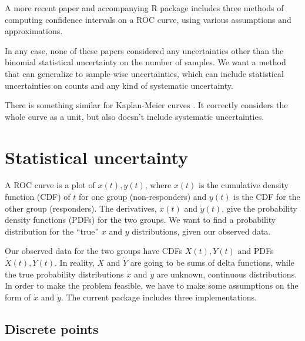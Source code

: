 \documentclass[11pt]{article}
\newcommand{\xdot}{\dot{x}}
\newcommand{\ydot}{\dot{y}}
\newcommand{\Xdot}{\dot{X}}
\newcommand{\Ydot}{\dot{Y}}
\begin{document}
A more recent paper and accompanying R package \autocite{roc_fernandez} includes three methods of computing confidence intervals on a ROC curve, using various assumptions and approximations.

In any case, none of these papers considered any uncertainties other than the binomial statistical uncertainty on the number of samples.  We want a method that can generalize to sample-wise uncertainties, which can include statistical uncertainties on counts and any kind of systematic uncertainty.

There is something similar for Kaplan-Meier curves \autocite{kaplanmeier_sachs}.  It correctly considers the whole curve as a unit, but also doesn't include systematic uncertainties.

\section{Statistical uncertainty}\label{sec:stat}

A ROC curve is a plot of \(x(t), y(t)\), where \(x(t)\) is the cumulative density function (CDF) of \(t\) for one group (non-responders) and \(y(t)\) is the CDF for the other group (responders).  The derivatives, \(\xdot(t)\) and \(\ydot(t)\), give the probability density functions (PDFs) for the two groups.   We want to find a probability distribution for the ``true'' \(x\) and \(y\) distributions, given our observed data.

Our observed data for the two groups have CDFs \(X(t), Y(t)\) and PDFs \(\Xdot(t), \Ydot(t)\).  In reality, \(\Xdot\) and \(\Ydot\) are going to be sums of delta functions, while the true probability distributions \(\xdot\) and \(\ydot\) are unknown, continuous distributions.  In order to make the problem feasible, we have to make some assumptions on the form of \(\xdot\) and \(\ydot\).  The current package includes three implementations.

\subsection{Discrete points}\label{sec:discrete}
\end{document}
